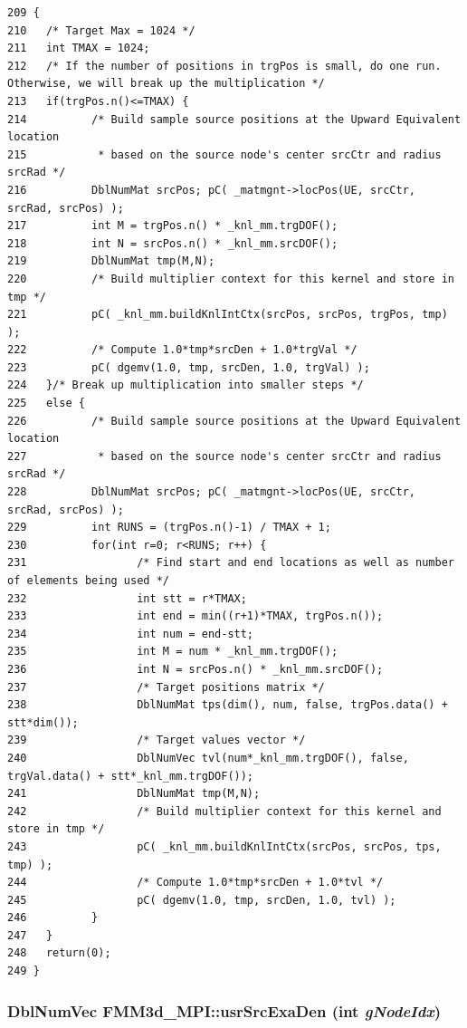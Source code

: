 \footnotesize\begin{verbatim}209 {
210   /* Target Max = 1024 */
211   int TMAX = 1024;
212   /* If the number of positions in trgPos is small, do one run.  Otherwise, we will break up the multiplication */
213   if(trgPos.n()<=TMAX) {
214          /* Build sample source positions at the Upward Equivalent location
215           * based on the source node's center srcCtr and radius srcRad */
216          DblNumMat srcPos; pC( _matmgnt->locPos(UE, srcCtr, srcRad, srcPos) );
217          int M = trgPos.n() * _knl_mm.trgDOF();
218          int N = srcPos.n() * _knl_mm.srcDOF();
219          DblNumMat tmp(M,N);
220          /* Build multiplier context for this kernel and store in tmp */
221          pC( _knl_mm.buildKnlIntCtx(srcPos, srcPos, trgPos, tmp) );
222          /* Compute 1.0*tmp*srcDen + 1.0*trgVal */
223          pC( dgemv(1.0, tmp, srcDen, 1.0, trgVal) );
224   }/* Break up multiplication into smaller steps */
225   else {
226          /* Build sample source positions at the Upward Equivalent location
227           * based on the source node's center srcCtr and radius srcRad */
228          DblNumMat srcPos; pC( _matmgnt->locPos(UE, srcCtr, srcRad, srcPos) );
229          int RUNS = (trgPos.n()-1) / TMAX + 1;
230          for(int r=0; r<RUNS; r++) {
231                 /* Find start and end locations as well as number of elements being used */
232                 int stt = r*TMAX;
233                 int end = min((r+1)*TMAX, trgPos.n());
234                 int num = end-stt;
235                 int M = num * _knl_mm.trgDOF();
236                 int N = srcPos.n() * _knl_mm.srcDOF();
237                 /* Target positions matrix */
238                 DblNumMat tps(dim(), num, false, trgPos.data() + stt*dim());
239                 /* Target values vector */
240                 DblNumVec tvl(num*_knl_mm.trgDOF(), false, trgVal.data() + stt*_knl_mm.trgDOF());
241                 DblNumMat tmp(M,N);
242                 /* Build multiplier context for this kernel and store in tmp */
243                 pC( _knl_mm.buildKnlIntCtx(srcPos, srcPos, tps, tmp) );
244                 /* Compute 1.0*tmp*srcDen + 1.0*tvl */
245                 pC( dgemv(1.0, tmp, srcDen, 1.0, tvl) );
246          }
247   }
248   return(0);
249 }
\end{verbatim}\normalsize 


\subsubsection{\setlength{\rightskip}{0pt plus 5cm}Dbl\-Num\-Vec FMM3d\_\-MPI::usr\-Src\-Exa\-Den (int {\em g\-Node\-Idx})\hspace{0.3cm}{\tt  [protected]}}\label{classFMM3d__MPI_18bd00939022567796445492023361f8_18bd00939022567796445492023361f8}


